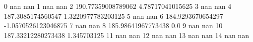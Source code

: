 0 nan nan
1 nan nan
2 190.77359008789062 4.78717041015625
3 nan nan
4 187.3085174560547 1.3220977783203125
5 nan nan
6 184.9293670654297 -1.0570526123046875
7 nan nan
8 185.98641967773438 0.0
9 nan nan
10 187.33212280273438 1.345703125
11 nan nan
12 nan nan
13 nan nan
14 nan nan
